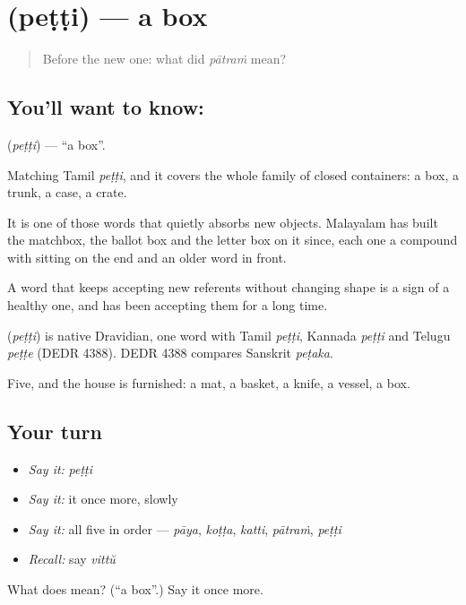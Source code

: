 \section[\texorpdfstring{\ml{പെട്ടി} (peṭṭi)}{പെട്ടി (peṭṭi)}]{ (peṭṭi) — a box}

\label{lesson:ML-C56-box}



\begin{quote}
Before the new one: what did \emph{pātraṁ} mean?
\end{quote}

\subsection*{You'll want to know: }
\textbf{} (\emph{peṭṭi}) — \textquotedblleft{}a box\textquotedblright{}.

Matching Tamil \emph{peṭṭi}, and it covers the whole family of closed containers: a box, a trunk, a case, a crate.

It is one of those words that quietly absorbs new objects. Malayalam has built the matchbox, the ballot box and the letter box on it since, each one a compound with  sitting on the end and an older word in front.

A word that keeps accepting new referents without changing shape is a sign of a healthy one, and  has been accepting them for a long time.

\begin{cousinweb}
\textbf{} (\emph{peṭṭi}) is native Dravidian, one word with Tamil \emph{peṭṭi}, Kannada \emph{peṭṭi} and Telugu \emph{peṭṭe} (DEDR 4388). DEDR 4388 compares Sanskrit \emph{peṭaka}.
\end{cousinweb}

\begin{grammarlens}[title={What you've built}]
Five, and the house is furnished: a mat, a basket, a knife, a vessel, a box.
\end{grammarlens}

\subsection*{Your turn}
\begin{itemize}
\raggedright
  \item \emph{Say it:} \emph{peṭṭi}
  \item \emph{Say it:} it once more, slowly
  \item \emph{Say it:} all five in order — \emph{pāya}, \emph{koṭṭa}, \emph{katti}, \emph{pātraṁ}, \emph{peṭṭi}
  \item \emph{Recall:} say \emph{vittŭ}
\end{itemize}

\begin{tcolorbox}[breakable,colback=teal!4,colframe=teal!35!black,title={Before you move on}]
What does  mean? (\textquotedblleft{}a box\textquotedblright{}.) Say it once more.
\end{tcolorbox}

